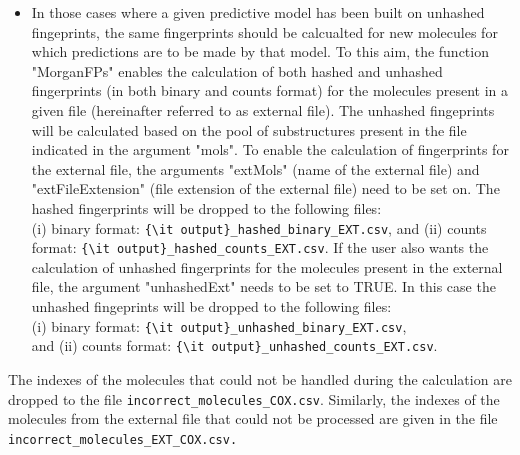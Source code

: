 \documentclass[twoside,a4wide,12pt]{article}\usepackage[]{graphicx}\usepackage[]{color}
\begin{document}
\begin{itemize}
\item In those cases where a given predictive model has been built on unhashed fingeprints, the same fingerprints should be 
calcualted for new molecules for which predictions are to be made by that model. 
To this aim, the function "MorganFPs" enables the calculation of both hashed and unhashed fingerprints (in both binary and counts format) for the molecules present in a given file (hereinafter referred to as external file). The unhashed fingeprints will be calculated based on the pool of substructures present in the file indicated in the argument "mols".
To enable the calculation of fingerprints for the external file, the arguments "extMols" (name of the external file) and "extFileExtension" (file extension of the external file) need to be set on. 
The hashed fingerprints will be dropped to the following files:\\
(i) binary format: \verb|{\it output}_hashed_binary_EXT.csv|, and (ii) counts format: 
\verb|{\it output}_hashed_counts_EXT.csv|.
If the user also wants the calculation of unhashed fingerprints for the molecules present in the external file, the argument "unhashedExt" needs to be set to TRUE. 
In this case the unhashed fingeprints will be dropped to the following files:\\
(i) binary format: \verb|{\it output}_unhashed_binary_EXT.csv|,\\
and (ii) counts format: \verb|{\it output}_unhashed_counts_EXT.csv|.

\end{itemize}

The indexes of the molecules that could not be handled during the calculation are dropped to the file \verb|incorrect_molecules_COX.csv|. Similarly, the indexes of the molecules from the external file that could not be processed are given in the file \verb|incorrect_molecules_EXT_COX.csv.|
\end{document}
